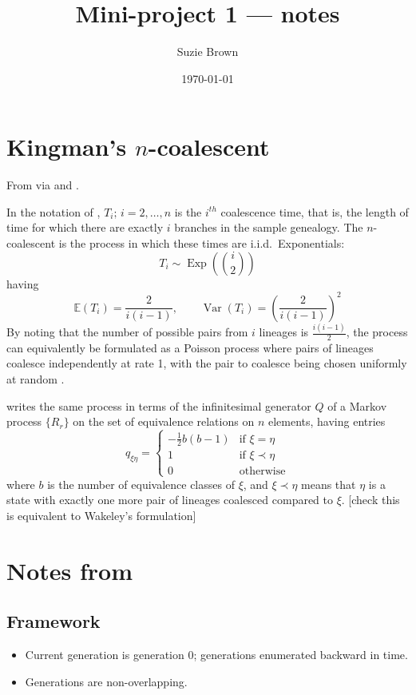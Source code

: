 \documentclass{article}
\title{Mini-project 1 --- notes}
\author{Suzie Brown}
\date{\today}
\newcommand{\E}{\mathbb{E}}
\newcommand{\V}{\operatorname{Var}}
\begin{document}
\section*{Kingman's $n$-coalescent}
From \citet{kingman1982} via \citet[Chapter 3]{wakeley2009} and \citet{mohle1998}.

In the notation of \citet{wakeley2009}, $T_i;\, i=2,\dots,n$ is the $i^{th}$ coalescence time, that is, the length of time for which there are exactly $i$ branches in the sample genealogy. The $n$-coalescent is the process in which these times are i.i.d.\ Exponentials:
\begin{equation*}
T_i \sim \operatorname{Exp}\left(\binom{i}{2}\right)
\end{equation*}
having
\begin{equation*}
\E(T_i) = \frac{2}{i(i-1)}, \qquad \V(T_i) = \left( \frac{2}{i(i-1)} \right)^2
\end{equation*}
By noting that the number of possible pairs from $i$ lineages is $\frac{i(i-1)}{2}$, the process can equivalently be formulated as a Poisson process where pairs of lineages coalesce independently at rate 1, with the pair to coalesce being chosen uniformly at random \citep[Section 3.2]{wakeley2009}.

\citet{mohle1998} writes the same process in terms of the infinitesimal generator $Q$ of a Markov process $\{R_r\}$ on the set of equivalence relations on $n$ elements, having entries
\begin{equation*}
q_{\xi\eta} =
\begin{cases}
-\frac{1}{2}b(b-1) &\text{if }\xi=\eta \\
1 & \text{if }\xi \prec\eta \\
0 & \text{otherwise}
\end{cases}
\end{equation*}
where $b$ is the number of equivalence classes of $\xi$, and $\xi \prec \eta$ means that $\eta$ is a state with exactly one more pair of lineages coalesced compared to $\xi$. [check this is equivalent to Wakeley's formulation]


\section*{Notes from \citet{mohle1998}}

\subsection*{Framework}
\begin{itemize}
\item Current generation is generation $0$; generations enumerated backward in time.
\item Generations are non-overlapping.
\end{itemize}
\end{document}
